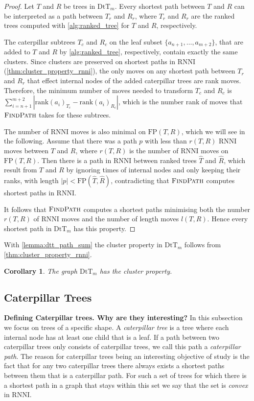 \documentclass[11pt]{amsart}
\newtheorem{corollary}{Corollary}
\newcommand{\rnni}{\mathrm{RNNI}}
\newcommand{\findpath}{\textsc{FindPath}}
\newcommand{\rank}{\mathrm{rank}}
\newcommand{\fp}{\mathrm{FP}}
\newcommand{\dtt}{\mathrm{DtT}}
\newcommand{\summary}[1]{\textbf{#1}} %
\begin{document}
\begin{proof}
	Let $T$ and $R$ be trees in $\dtt_m$.
	Every shortest path between $T$ and $R$ can be interpreted as a path between $T_r$ and $R_r$, where $T_r$ and $R_r$ are the ranked trees computed with \autoref{alg:ranked_tree} for $T$ and $R$, respectively.

	The caterpillar subtrees $T_c$ and $R_c$ on the leaf subset $\{a_{n+1}, \ldots, a_{m+2}\}$, that are added to $T$ and $R$ by \autoref{alg:ranked_tree}, respectively, contain exactly the same clusters.
	Since clusters are preserved on shortest paths in $\rnni$ (\autoref{thm:cluster_property_rnni}), the only moves on any shortest path between $T_r$ and $R_r$ that effect internal nodes of the added caterpillar trees are rank moves.
	Therefore, the minimum number of moves needed to transform $T_c$ and $R_c$ is $\sum_{i = n+1}^{m+2} |\rank(a_{i})_{T_c} - \rank(a_{i})_{R_c}|$, which is the number rank of moves that $\findpath$ takes for these subtrees.

	The number of $\rnni$ moves is also minimal on $\fp(T,R)$, which we will see in the following.
	Assume that there was a path $p$ with less than $r(T,R)$ $\rnni$ moves between $T$ and $R$, where $r(T,R)$ is the number of $\rnni$ moves on $\fp(T,R)$.
	Then there is a path in $\rnni$ between ranked trees $\hat T$ and $\hat R$, which result from $T$ and $R$ by ignoring times of internal nodes and only keeping their ranks, with length $|p| < \fp(\hat T, \hat R)$, contradicting that $\findpath$ computes shortest paths in $\rnni$.

	It follows that $\findpath$ computes a shortest paths minimising both the number $r(T,R)$ of $\rnni$ moves and the number of length moves $l(T,R)$.
	Hence every shortest path in $\dtt_m$ has this property.
\end{proof}

With \autoref{lemma:dtt_path_sum} the cluster property in $\dtt_m$ follows from \autoref{thm:cluster_property_rnni}.

\begin{corollary}
	The graph $\dtt_m$ has the cluster property.
\end{corollary}

\subsection{Caterpillar Trees}

\summary{Defining Caterpillar trees. Why are they interesting?}
In this subsection we focus on trees of a specific shape.
A \emph{caterpillar tree} is a tree where each internal node has at least one child that is a leaf.
If a path between two caterpillar trees only consists of caterpillar trees, we call this path a \emph{caterpillar path}.
The reason for caterpillar trees being an interesting objective of study is the fact that for any two caterpillar trees there always exists a shortest paths between them that is a caterpillar path.
For such a set of trees for which there is a shortest path in a graph that stays within this set we say that the set is \emph{convex} in $\rnni$.
\end{document}
